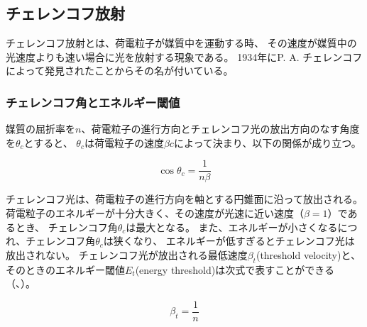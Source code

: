 \subsection{チェレンコフ放射}

チェレンコフ放射とは、荷電粒子が媒質中を運動する時、
その速度が媒質中の光速度よりも速い場合に光を放射する現象である。
1934年にP. A. チェレンコフによって発見されたことからその名が付いている。

\subsubsection{チェレンコフ角とエネルギー閾値}

媒質の屈折率を$n$、荷電粒子の進行方向とチェレンコフ光の放出方向のなす角度を$\theta_{c}$とすると、
$\theta_{c}$は荷電粒子の速度$\beta c$によって決まり、以下の関係が成り立つ。%

\begin{equation}
\cos \theta_{c} = \frac{1}{n\beta}
\label{CherenkovAngle}
\end{equation}

チェレンコフ光は、荷電粒子の進行方向を軸とする円錐面に沿って放出される。
荷電粒子のエネルギーが十分大きく、その速度が光速に近い速度（$\beta =1$）であるとき、
チェレンコフ角$\theta_{c}$は最大となる。
また、エネルギーが小さくなるにつれ、チェレンコフ角$\theta_{c}$は狭くなり、
エネルギーが低すぎるとチェレンコフ光は放出されない。
チェレンコフ光が放出される最低速度$\beta_{t}$(threshold velocity)と、
そのときのエネルギー閾値$E_{t}$(energy threshold)は次式で表すことができる（、）。

\begin{equation}
\beta_{t} = \frac{1}{n}
\label{ThresholdVelocity}
\end{equation}

%

